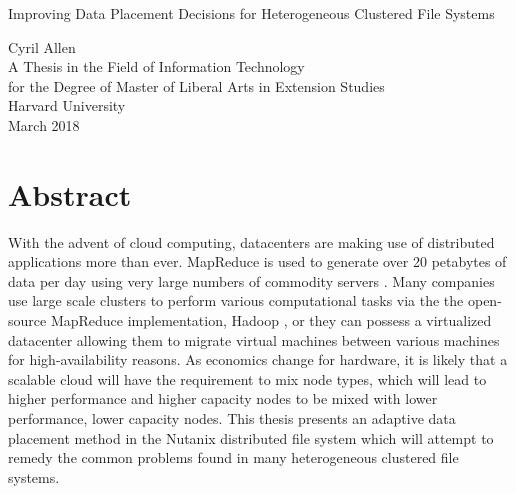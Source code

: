 \documentclass[12pt]{article}
\begin{document}
\begin{center}

  \vspace*{0.6in}
  Improving Data Placement Decisions for Heterogeneous Clustered File Systems

  \vspace{2.3in}
  Cyril Allen\\
  \vspace{1.8in}
  A Thesis in the Field of Information Technology\\
  for the Degree of Master of Liberal Arts in Extension Studies\\
  \vspace{.8in}
  Harvard University\\

  \vfill
  March 2018
  \vspace*{.5in}
\end{center}

\newpage
\null

\newpage

\section*{Abstract}
\thispagestyle{empty}

With the advent of cloud computing, datacenters are making use of distributed
applications more than ever. MapReduce is used to generate over 20 petabytes
of data per day using very large numbers of commodity servers
\cite{mapreduce}.  Many companies use large scale clusters to perform various
computational tasks via the the open-source MapReduce implementation, Hadoop
\cite{hadoop}, or they can possess a virtualized datacenter allowing them to
migrate virtual machines between various machines for high-availability
reasons. As economics change for hardware, it is likely that a scalable cloud
will have the requirement to mix node types, which will lead to higher
performance and higher capacity nodes to be mixed with lower performance,
lower capacity nodes. This thesis presents an adaptive data placement method
in the Nutanix distributed file system which will attempt to remedy the common
problems found in many heterogeneous clustered file systems.

\clearpage
\newpage
\end{document}
